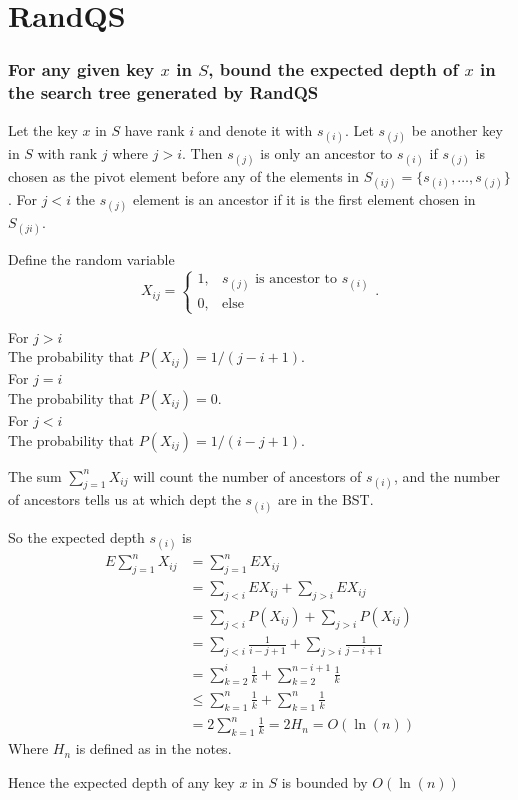 \section*{RandQS}
\subsubsection*{For any given key $x$ in $S$, bound the expected depth of $x$ in the search tree generated by RandQS}

Let the key $x$ in $S$ have rank $i$ and denote it with $s_{(i)}$. Let $s_{(j)}$ be another key in $S$ with rank $j$ where $j>i$. 
Then $s_{(j)}$ is only an ancestor to $s_{(i)}$ if $s_{(j)}$ is chosen as the pivot element before any of the elements in $S_{(ij)} = \{s_{(i)},\ldots,s_{(j)}\}$. For $j<i$ the $s_{(j)}$ element is an ancestor if it is the first element chosen in $S_{(ji)}$.

Define the random variable 
$$
X_{ij}=
\begin{cases}
1, & s_{(j)} \text{ is ancestor to } s_{(i)}\\
0, &\text{else}
\end{cases}.
$$

For $j>i$ 
\\
The probability that $P(X_{ij}) = 1/(j-i+1)$.
\\
For $j=i$ 
\\
The probability that $P(X_{ij}) = 0$.
\\
For $j<i$ 
\\
The probability that $P(X_{ij}) = 1/(i-j+1)$.

The sum $\sum_{j=1}^n X_{ij}$ will count the number of ancestors of $s_{(i)}$, and the number of ancestors tells us at which dept the $s_{(i)}$ are in the BST.

So the expected depth $s_{(i)}$ is
\begin{align*}
E \sum_{j=1}^n X_{ij} &=  \sum_{j=1}^n EX_{ij} \\
                      &= \sum_{j<i} EX_{ij} + \sum_{j>i} EX_{ij} \\
											&= \sum_{j<i} P(X_{ij}) + \sum_{j>i} P(X_{ij})\\
											&= \sum_{j<i} \frac{1}{i-j+1} + \sum_{j>i} \frac{1}{j-i+1}\\
											&= \sum_{k=2}^i \frac{1}{k} + \sum_{k=2}^{n-i+1} \frac{1}{k}\\
											&\leq \sum_{k=1}^n \frac{1}{k} + \sum_{k=1}^{n} \frac{1}{k}\\
											&= 2\sum_{k=1}^n \frac{1}{k} = 2H_n = O(\ln(n))
\end{align*}
Where $H_n$ is defined as in the notes.

Hence the expected depth of any key $x$ in $S$ is bounded by $O(\ln(n))$